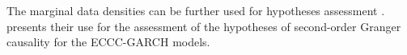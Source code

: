 \documentclass[final,3p,authoryear]{elsarticle}
\begin{document}

The marginal data densities can be further used for hypotheses assessment \citep[see e.g.][]{Kass1995}. \cite{Wozniak2012} presents their use for the assessment of the hypotheses of second-order Granger causality for the ECCC-GARCH models.
\end{document}
